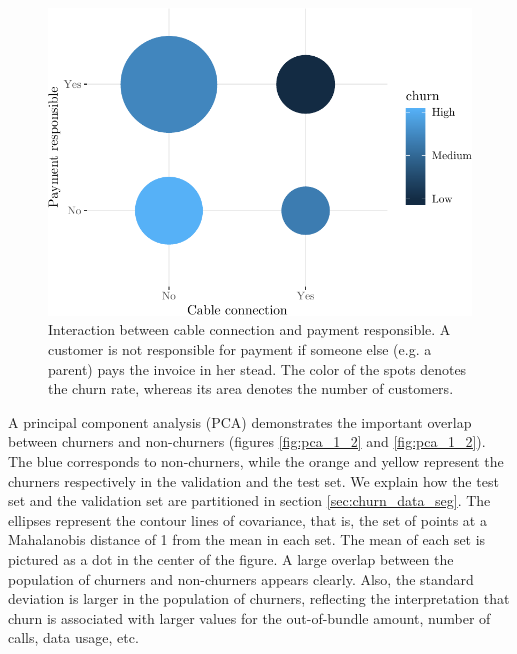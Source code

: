 \begin{figure}
    \centering
	\includegraphics[width=0.9\linewidth]{figures/flagcable_payment_responsible.pdf}
	\caption{Interaction between cable connection and payment responsible. A
	customer is not responsible for payment if someone else (e.g. a parent) pays
	the invoice in her stead. The color of the spots denotes the churn rate,
	whereas its area denotes the number of customers.}
	\label{fig:binary_payment_responsible}
\end{figure}


A principal component analysis (PCA) demonstrates the important overlap between
churners and non-churners (figures \ref{fig:pca_1_2} and \ref{fig:pca_1_2}). The
blue corresponds to non-churners, while the orange and yellow represent
the churners respectively in the validation and the test set. We explain how the
test set and the validation set are partitioned in section
\ref{sec:churn_data_seg}. The ellipses represent the contour lines of
covariance, that is, the set of points at a Mahalanobis distance of 1 from the
mean in each set. The mean of each set is pictured as a dot in the center of the
figure. A large overlap between the population
of churners and non-churners appears clearly. Also, the standard deviation is larger in the
population of churners, reflecting the interpretation that churn is associated
with larger values for the out-of-bundle amount, number of calls, data usage,
etc.

